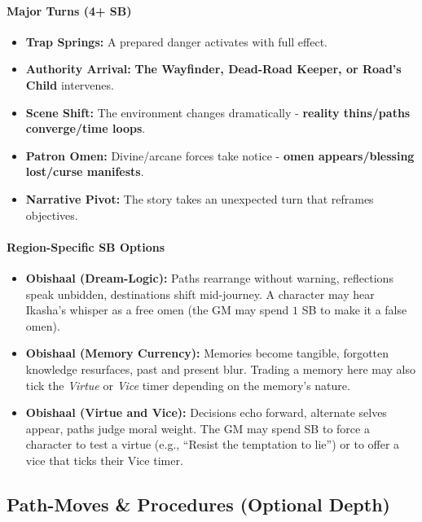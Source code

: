 \paragraph{Major Turns (4+ SB)}
\begin{itemize}
\item \textbf{Trap Springs:} A prepared danger activates with full effect.
\item \textbf{Authority Arrival:} \textbf{The Wayfinder, Dead-Road Keeper, or Road's Child} intervenes.
\item \textbf{Scene Shift:} The environment changes dramatically - \textbf{reality thins/paths converge/time loops}.
\item \textbf{Patron Omen:} Divine/arcane forces take notice - \textbf{omen appears/blessing lost/curse manifests}.
\item \textbf{Narrative Pivot:} The story takes an unexpected turn that reframes objectives.
\end{itemize}

\paragraph{Region-Specific SB Options}
\begin{itemize}
\item \textbf{Obishaal (Dream-Logic):} Paths rearrange without warning, reflections speak unbidden, destinations shift mid-journey. A character may hear Ikasha's whisper as a free omen (the GM may spend $1$ SB to make it a false omen).
\item \textbf{Obishaal (Memory Currency):} Memories become tangible, forgotten knowledge resurfaces, past and present blur. Trading a memory here may also tick the \emph{Virtue} or \emph{Vice} timer depending on the memory's nature.
\item \textbf{Obishaal (Virtue and Vice):} Decisions echo forward, alternate selves appear, paths judge moral weight. The GM may spend SB to force a character to test a virtue (e.g., ``Resist the temptation to lie'') or to offer a vice that ticks their Vice timer.
\end{itemize}

\subsection*{Path-Moves \& Procedures (Optional Depth)}
\label{sec:ways-between-procedures}

